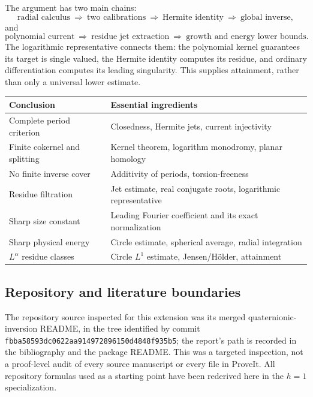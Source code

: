 \documentclass[11pt,a4paper]{article}
\numberwithin{equation}{section}
\theoremstyle{definition}
\theoremstyle{remark}
\begin{document}
The argument has two main chains:
\[
 \text{radial calculus}
 \ \Longrightarrow\ \text{two calibrations}
 \ \Longrightarrow\ \text{Hermite identity}
 \ \Longrightarrow\ \text{global inverse},
\]
and
\[
 \text{polynomial current}
 \ \Longrightarrow\ \text{residue jet extraction}
 \ \Longrightarrow\ \text{growth and energy lower bounds}.
\]
The logarithmic representative connects them: the polynomial kernel guarantees
its target is single valued, the Hermite identity computes its residue, and
ordinary differentiation computes its leading singularity. This supplies
attainment, rather than only a universal lower estimate.

\begin{center}
\begin{tabular}{p{}p{}}
\toprule
Conclusion & Essential ingredients \\
\midrule
Complete period criterion & Closedness, Hermite jets, current injectivity \\
Finite cokernel and splitting & Kernel theorem, logarithm monodromy, planar homology \\
No finite inverse cover & Additivity of periods, torsion-freeness \\
Residue filtration & Jet estimate, real conjugate roots, logarithmic representative \\
Sharp size constant & Leading Fourier coefficient and its exact normalization \\
Sharp physical energy & Circle estimate, spherical average, radial integration \\
$L^\alpha$ residue classes & Circle $L^1$ estimate, Jensen/H\"older, attainment \\
\bottomrule
\end{tabular}
\end{center}

\subsection{Repository and literature boundaries}

The repository source inspected for this extension was its merged
quaternionic-inversion README, in the tree identified by commit
\texttt{fbba58593dc0622aa914972896150d4848f935b5}; the report's path is recorded
in the bibliography and the package README. This was a targeted inspection,
not a proof-level audit of every source manuscript or every file in ProveIt.
All repository formulas used as a starting point have been rederived here
in the $h=1$ specialization.
\end{document}
